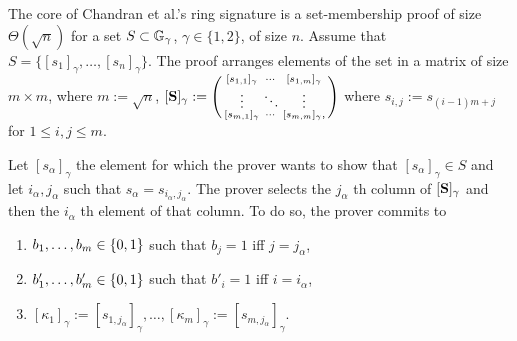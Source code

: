
The core of Chandran et al.'s ring signature is a set-membership proof of size $\Theta(\sqrt{n})$ for a set $S\subset\mathbb{G}_\gamma$, $\gamma\in\{1,2\}$, of size $n$. 
Assume that $S = \{[s_1]_\gamma,\ldots,[s_n]_\gamma\}$.
The proof arranges elements of the set in a matrix of size $m\times m$, where $m:=\sqrt{n}$,
$
[\mathbf{{S}}]_\gamma:=
\left(\begin{smallmatrix}
[s_{1,1}]_\gamma & \cdots & [s_{1,m}]_\gamma\\
\vdots     & \ddots & \vdots \\
[s_{m,1}]_\gamma  & \cdots & [s_{m,m}]_\gamma,
\end{smallmatrix}\right)
$
where $s_{i,j}:=s_{(i-1)m+j}$ for $1\leq i,j \leq m$.

Let $[s_\alpha]_\gamma$ the element for which the prover wants to show that $[s_\alpha]_\gamma\in S$ and let $i_\alpha,j_\alpha$ such that $s_\alpha = s_{i_\alpha,j_\alpha}$. The prover selects the $j_\alpha$ th column of $[\mathbf{{S}}]_\gamma$ and then the $i_\alpha$ th element of that column. To do so, the prover commits to 
\begin{enumerate}
\item $b_1,\ldots,b_m\in\{0,1\}$ such that $b_j=1$ iff $j=j_\alpha$,
\item $b'_1,\ldots,b'_m\in\{0,1\}$ such that $b'_i=1$ iff $i=i_\alpha$,
\item $[\kappa_1]_\gamma:=[s_{1,j_\alpha}]_\gamma,\ldots,[\kappa_m]_\gamma:=[s_{m,j_\alpha}]_\gamma$.
\end{enumerate}

